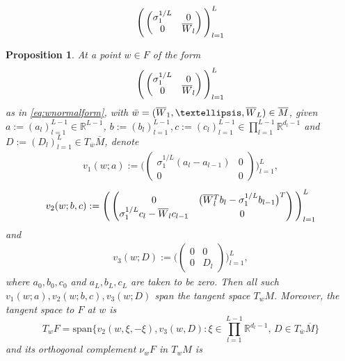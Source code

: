 \documentclass[10pt,a4paper]{amsart}
\newtheorem{proposition}{Proposition}
\newcommand{\RB}{\mathbb{R}}
\newcommand{\bM}{\overline{M}}
\newcommand{\bW}{\smash{\overline{W}}\vphantom{W}}
\newcommand{\bw}{\overline{w}}
\begin{document}
    \begin{align}\label{eq:wnormalform}
    \Bigg(\begin{pmatrix} \sigma_1^{1/L} & 0 \\ 0 & \bW_l\end{pmatrix}\Bigg)_{l=1}^L
    \end{align}

\begin{proposition}\label{prop:tangents}
    At a point $w\in F$ of the form
    \begin{align}
    \Bigg(\begin{pmatrix} \sigma_1^{1/L} & 0 \\ 0 & \bW_l\end{pmatrix}\Bigg)_{l=1}^L
    \end{align}
    as in \eqref{eq:wnormalform}, with $\bar{w}=(\bW_1,\dots,\bW_L)\in\overline{M}$, given $a:=(a_l)_{l=1}^{L-1}\in \RB^{L-1}$, $b:=(b_l)_{l=1}^{L-1},c:=(c_l)_{l=1}^{L-1}\in\prod_{l=1}^{L-1}\RB^{d_l-1}$ and $D:=(D_l)_{l=1}^{L}\in T_{\bw}\bM$, denote
    \begin{align}
        v_1(w;a):=\Bigg(\begin{pmatrix} \sigma_1^{1/L}(a_l-a_{l-1}) & 0 \\ 0 & 0\end{pmatrix}\Bigg)_{l=1}^{L},
    \end{align}
    \begin{align}
        v_2(w;b,c):=\Bigg(\begin{pmatrix} 0 & \big(\bW_l^Tb_l - \sigma_1^{1/L}b_{l-1}\big)^T \\ \sigma_1^{1/L}c_l-\bW_lc_{l-1} & 0\end{pmatrix}\Bigg)_{l=1}^{L}
    \end{align}
    and
    \begin{align}
        v_3(w;D):=\bigg(\begin{pmatrix} 0 & 0 \\ 0 & D_l\end{pmatrix}\bigg)_{l=1}^{L},
    \end{align}
    where $a_0,b_0,c_0$ and $a_L,b_L,c_L$ are taken to be zero. Then all such $v_1(w;a),v_2(w;b,c),v_3(w;D)$ span the tangent space $T_wM$. Moreover, the tangent space to $F$ at $w$ is
    \begin{equation}
        T_wF = \mathrm{span}\bigg\{v_2(w,\xi,-\xi),v_3(w,D):\xi\in\prod_{l=1}^{L-1}\RB^{d_l-1},\,D\in T_{\bw}\bM\bigg\}
    \end{equation}
    and its orthogonal complement $\nu_wF$ in $T_wM$ is

\end{proposition}
\end{document}
